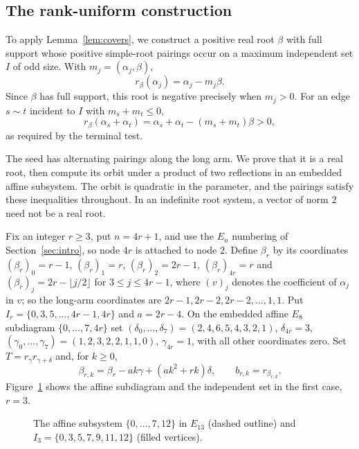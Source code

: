 \documentclass[10pt]{article}
\theoremstyle{remark}
\begin{document}
\subsection{The rank-uniform construction}\label{sec:uniform}
To apply Lemma~\ref{lem:covers}, we construct a positive real root
$\beta$ with full support whose positive simple-root pairings occur on
a maximum independent set $I$ of odd size. With $m_j=(\alpha_j,\beta)$,
\[
 r_\beta(\alpha_j)=\alpha_j-m_j\beta.
\]
Since $\beta$ has full support, this root is negative precisely when
$m_j>0$. For an edge $s\sim t$ incident to $I$ with $m_s+m_t\leq0$,
\[
 r_\beta(\alpha_s+\alpha_t)
 =\alpha_s+\alpha_t-(m_s+m_t)\beta>0,
\]
as required by the terminal test.

The seed has alternating pairings along the long arm. We prove that it
is a real root, then compute its orbit under a product of two reflections
in an embedded affine subsystem. The orbit is quadratic in the parameter,
and the pairings satisfy these inequalities throughout. In an indefinite
root system, a vector of norm $2$ need not be a real root.

Fix an integer $r\geq3$, put $n=4r+1$, and use the $E_n$ numbering of
Section~\ref{sec:intro}, so node $4r$ is attached to node $2$. Define
$\beta_r$ by its coordinates $(\beta_r)_0=r-1$, $(\beta_r)_1=r$,
$(\beta_r)_2=2r-1$, $(\beta_r)_{4r}=r$ and $(\beta_r)_j=2r-\lfloor j/2\rfloor$
for $3\leq j\leq4r-1$, where $(v)_j$ denotes the coefficient of $\alpha_j$
in $v$; so the long-arm coordinates are $2r-1,2r-2,2r-2,\ldots,1,1$. Put
$I_r=\{0,3,5,\ldots,4r-1,4r\}$ and $a=2r-4$. On the embedded affine $E_8$
subdiagram $\{0,\ldots,7,4r\}$ set
$(\delta_0,\ldots,\delta_7)=(2,4,6,5,4,3,2,1)$, $\delta_{4r}=3$,
$(\gamma_0,\ldots,\gamma_7)=(1,2,3,2,2,1,1,0)$, $\gamma_{4r}=1$, with all
other coordinates zero. Set $T=r_\gamma r_{\gamma+\delta}$ and, for
$k\geq0$,
\begin{equation}\label{eq:uniformroots}
 \beta_{r,k}=\beta_r-ak\gamma+(ak^2+rk)\delta,\qquad
 b_{r,k}=r_{\beta_{r,k}}.
\end{equation}
Figure~\ref{fig:uniform-subsystem} shows the affine subdiagram and the
independent set in the first case, $r=3$.
\begin{figure}[htbp]
\centering
{}
\caption{The affine subsystem $\{0,\ldots,7,12\}$ in $E_{13}$
(dashed outline) and $I_3=\{0,3,5,7,9,11,12\}$ (filled vertices).}
\label{fig:uniform-subsystem}
\end{figure}
\end{document}
